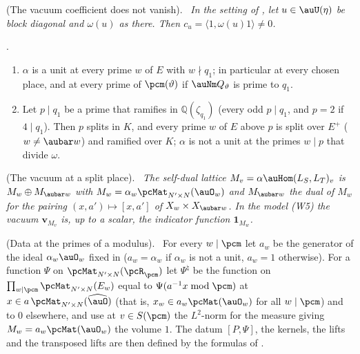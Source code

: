 \documentclass[10pt]{amsart}
\theoremstyle{definition}
\theoremstyle{remark}
\newcommand{\Q}{\mathbb Q}
\providecommand{\psvac}{\mathbf v}
\newenvironment{quotedthm}[2]{\par\medskip\noindent\begingroup
  \textbf{#1}#2.\ \itshape\ignorespaces}{\endgroup\par\medskip}
\newenvironment{quoteddef}[2]{\par\medskip\noindent\begingroup
  \textbf{#1}#2.\ \ignorespaces}{\endgroup\par\medskip}
\begin{document}
\begin{quotedthm}{\cite[Lemma~4.24]{P53}}{ (The vacuum coefficient does not vanish)}
In the setting of {\cite[\S4.2.1]{P53}}, let $u\in\auU(\eta)$ be block diagonal and $\omega(u)$ as
there. Then $c_u=\langle1,\omega(u)1\rangle\ne0$.
\end{quotedthm}

\begin{quotedthm}{\cite[Proposition~6.9]{P53}}{}
\begin{enumerate}
\item[(a)] $\alpha$ is a unit at every prime $w$ of $E$ with $w\nmid q_1$; in particular at every
chosen place, and at every prime of $\pcm(\vartheta)$ if $\auNm Q_\vartheta$ is prime to $q_1$.
\item[(b)] Let $p\mid q_1$ be a prime that ramifies in $\Q(\zeta_{q_1})$ (every odd $p\mid q_1$, and
$p=2$ if $4\mid q_1$). Then $p$ splits in $K$, and every prime $w$ of $E$ above $p$ is split over $E^+$
($w\ne\aubar w$) and ramified over $K$; $\alpha$ is not a unit at the primes $w\mid p$ that divide
$\omega$.
\end{enumerate}
\end{quotedthm}

\begin{quotedthm}{\cite[Lemma~6.30]{P53}}{ (The vacuum at a split place)}
The self-dual lattice $M_v=\alpha\auHom(L_S,L_T)_v$ is $M_w\oplus M_{\aubar w}$ with
$M_w=\alpha_w\pcMat_{N'\times N}(\auO_w)$ and $M_{\aubar w}$ the dual of $M_w$ for the pairing
$(x,a')\mapsto[x,a']$ of $X_w\times X_{\aubar w}$. In the model (W5) the vacuum $\psvac_{M_v}$ is,
up to a scalar, the indicator function $\mathbf 1_{M_w}$.
\end{quotedthm}

\begin{quoteddef}{\cite[Definition~6.31]{P53}}{ (Data at the primes of a modulus)}
For every $w\mid\pcm$ let $a_w$ be the generator of the ideal $\alpha_w\auO_w$ fixed in
{\cite[\S5.1.1]{P49}} ($a_w=\alpha_w$ if $\alpha_w$ is not a unit, $a_w=1$ otherwise). For a function $\Psi$ on
$\pcMat_{N'\times N}(\pcR_\pcm)$ let $\Psi^\natural$ be the function on $\prod_{w\mid\pcm}
\pcMat_{N'\times N}(E_w)$ equal to $\Psi(a^{-1}x\bmod\pcm)$ at $x\in a\,\pcMat_{N'\times N}
(\widehat\auO)$ (that is, $x_w\in a_w\pcMat(\auO_w)$ for all $w\mid\pcm$) and to $0$ elsewhere, and
use at $v\in S(\pcm)$ the $L^2$-norm for the measure giving $M_w=a_w\pcMat(\auO_w)$ the volume $1$.
The datum $[P,\Psi]$, the kernels, the lifts and the transposed lifts are then defined by the
formulas of {\cite[\S2.3]{P53}}.
\end{quoteddef}
\end{document}
